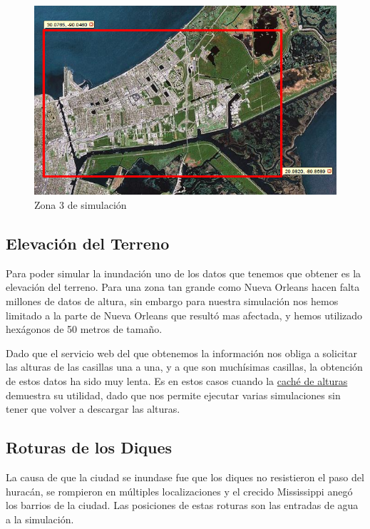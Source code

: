 \begin{figure}[H]
 \centering
 \includegraphics[width=135mm]{figuras/cap6/NOarea4.png}
 \caption{Zona 3 de simulación} \label{zona3}
\end{figure}

\subsection{Elevación del Terreno}

Para poder simular la inundación uno de los datos que tenemos que obtener es
la elevación del terreno. Para una zona tan grande como Nueva Orleans hacen
falta millones de datos de altura, sin embargo para nuestra simulación nos hemos
limitado a la parte de Nueva Orleans que resultó mas afectada, y hemos utilizado
hexágonos de 50 metros de tamaño.

Dado que el servicio web del que obtenemos la información nos obliga a
solicitar las alturas de las casillas una a una, y a que son muchísimas
casillas, la obtención de estos datos ha sido muy lenta. Es en estos casos
cuando la \hyperref[cache]{caché de alturas} demuestra su utilidad, dado que
nos permite ejecutar varias simulaciones sin tener que volver a descargar las
alturas.

\subsection{Roturas de los Diques}

La causa de que la ciudad se inundase fue que los diques no resistieron el paso
del huracán, se rompieron en múltiples localizaciones y el crecido Mississippi
anegó los barrios de la ciudad. Las posiciones\cite{Pennington06} de estas
roturas son las entradas de agua a la simulación.

